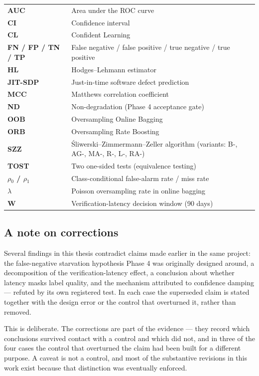 \begin{longtable}[]{@{}
  >{\raggedright\arraybackslash}p{}
  >{\raggedright\arraybackslash}p{}@{}}
\toprule\noalign{}
\endhead
\bottomrule\noalign{}
\endlastfoot
\textbf{AUC} & Area under the ROC curve \\
\textbf{CI} & Confidence interval \\
\textbf{CL} & Confident Learning \\
\textbf{FN / FP / TN / TP} & False negative / false positive / true
negative / true positive \\
\textbf{HL} & Hodges--Lehmann estimator \\
\textbf{JIT-SDP} & Just-in-time software defect prediction \\
\textbf{MCC} & Matthews correlation coefficient \\
\textbf{ND} & Non-degradation (Phase 4 acceptance gate) \\
\textbf{OOB} & Oversampling Online Bagging \\
\textbf{ORB} & Oversampling Rate Boosting \\
\textbf{SZZ} & \'{S}liwerski--Zimmermann--Zeller algorithm (variants: B-,
AG-, MA-, R-, L-, RA-) \\
\textbf{TOST} & Two one-sided tests (equivalence testing) \\
\textbf{\ensuremath{\rho}\ensuremath{_0} / \ensuremath{\rho}\ensuremath{_1}} & Class-conditional false-alarm rate / miss rate \\
\textbf{\ensuremath{\lambda}} & Poisson oversampling rate in online bagging \\
\textbf{W} & Verification-latency decision window (90 days) \\
\end{longtable}

\subsection{A note on corrections}\label{a-note-on-corrections}

Several findings in this thesis contradict claims made earlier in the
same project: the false-negative starvation hypothesis Phase 4 was
originally designed around, a decomposition of the verification-latency
effect, a conclusion about whether latency masks label quality, and the
mechanism attributed to confidence damping --- refuted by its own
registered test. In each case the superseded claim is stated together
with the design error or the control that overturned it, rather than
removed.

This is deliberate. The corrections are part of the evidence --- they
record which conclusions survived contact with a control and which did
not, and in three of the four cases the control that overturned the
claim had been built for a different purpose. A caveat is not a control,
and most of the substantive revisions in this work exist because that
distinction was eventually enforced.

